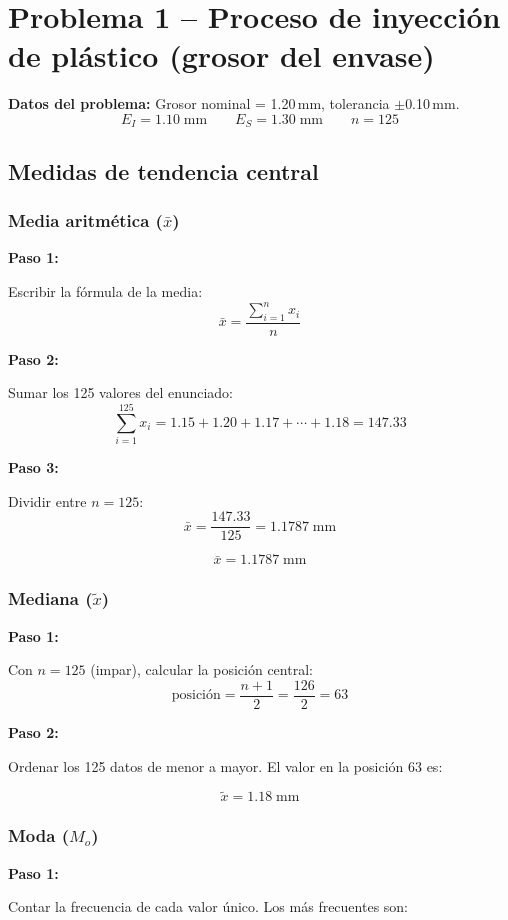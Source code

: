 \documentclass[12pt,letterpaper]{article}
\newcommand{\resultado}[2][Resultado]{%
  \begin{tcolorbox}[resultadoStyle, title={#1}]#2\end{tcolorbox}}
\newcommand{\paso}[1]{%
  \vspace{4pt}%
  \begin{tcolorbox}[pasoStyle]%
    \textbf{\color{azulprin}Paso #1:}%
  \end{tcolorbox}%
  \vspace{2pt}}
\newcommand{\formula}[1]{\vspace{2pt}\[ #1 \]\vspace{-4pt}}
\begin{document}
\section{Problema 1 -- Proceso de inyecci\'on de pl\'astico (grosor del envase)}

\noindent\textbf{Datos del problema:} Grosor nominal = 1.20\,mm, tolerancia $\pm$0.10\,mm.
\[
  E_I = 1.10\;\text{mm} \qquad E_S = 1.30\;\text{mm} \qquad n = 125
\]

\subsection{Medidas de tendencia central}

\subsubsection*{Media aritm\'etica ($\bar{x}$)}

\paso{1} Escribir la f\'ormula de la media:
\formula{\bar{x} = \frac{\displaystyle\sum_{i=1}^{n} x_i}{n}}

\paso{2} Sumar los 125 valores del enunciado:
\formula{\sum_{i=1}^{125} x_i = 1.15 + 1.20 + 1.17 + \cdots + 1.18 = 147.33}

\paso{3} Dividir entre $n = 125$:
\formula{\bar{x} = \frac{147.33}{125} = 1.1787\;\text{mm}}

\resultado[$\bar{x}$ -- Media]{\[ \bar{x} = 1.1787\;\text{mm} \]}

\subsubsection*{Mediana ($\tilde{x}$)}

\paso{1} Con $n = 125$ (impar), calcular la posici\'on central:
\formula{\text{posici\'on} = \frac{n+1}{2} = \frac{126}{2} = 63}

\paso{2} Ordenar los 125 datos de menor a mayor. El valor en la posici\'on 63 es:

\resultado[$\tilde{x}$ -- Mediana]{\[ \tilde{x} = 1.18\;\text{mm} \]}

\subsubsection*{Moda ($M_o$)}

\paso{1} Contar la frecuencia de cada valor \'unico. Los m\'as frecuentes son:
\end{document}
